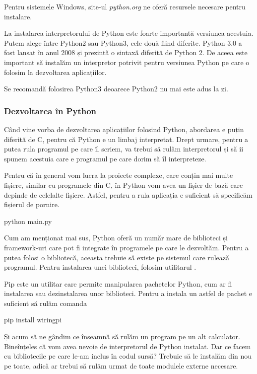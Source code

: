 Pentru sistemele Windows, site-ul \textit{python.org} ne oferă resursele
necesare pentru instalare.

La instalarea interpretorului de Python este foarte importantă versiunea
acestuia. Putem alege între Python2 sau Python3, cele două fiind diferite.
Python 3.0 a fost lansat în anul 2008 și prezintă o sintaxă diferită de Python
2. De aceea este important să instalăm un interpretor potrivit pentru versiunea
Python pe care o folosim la dezvoltarea aplicațiilor.

Se recomandă folosirea Python3 deoarece Python2 nu mai este adus la zi.

\subsubsection{Dezvoltarea în Python}
\label{sec:appdev-ideinstall-python-dev}

Când vine vorba de dezvoltarea aplicațiilor folosind Python, abordarea e puțin
diferită de C, pentru că Python e un limbaj interpretat. Drept urmare, pentru a
putea rula programul pe care îl scriem, va trebui să rulăm interpretorul și să
ii spunem acestuia care e programul pe care dorim să îl interpreteze.

Pentru că în general vom lucra la proiecte complexe, care conțin mai multe
fișiere, similar cu programele din C, în Python vom avea un fișier de bază care
depinde de celelalte fișiere. Astfel, pentru a rula aplicația e suficient să
specificăm fișierul de pornire.

\begin{screen}
python main.py
\end{screen}

Cum am menționat mai sus, Python oferă un număr mare de biblioteci și
framework-uri care pot fi integrate în programele pe care le dezvoltăm. Pentru a
putea folosi o bibliotecă, aceasta trebuie să existe pe sistemul care rulează
programul. Pentru instalarea unei biblioteci, folosim utilitarul .

Pip este un utilitar care permite manipularea pachetelor Python, cum ar fi
instalarea sau dezinstalarea unor biblioteci. Pentru a instala un astfel de
pachet e suficient să rulăm comanda 

\begin{screen}
pip install wiringpi
\end{screen}

Și acum să ne gândim ce înseamnă să rulăm un program pe un alt calculator.
Bineînțeles că vom avea nevoie de interpretorul de Python instalat. Dar ce facem
cu bibliotecile pe care le-am inclus în codul sursă? Trebuie să le instalăm din
nou pe toate, adică ar trebui să rulăm  urmat de toate modulele
externe necesare.

